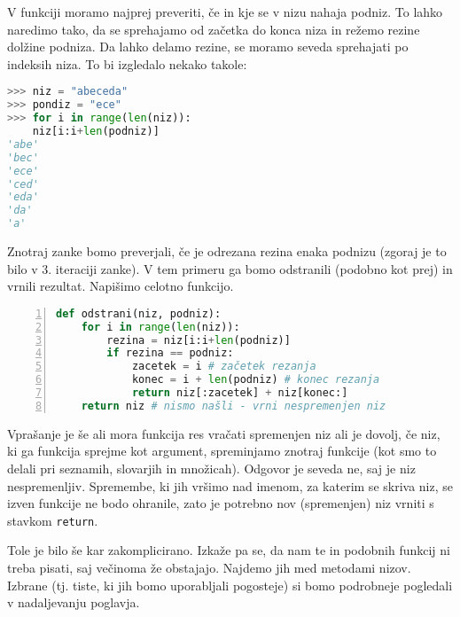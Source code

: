 \begin{resitev}
V funkciji moramo najprej preveriti, če in kje se v nizu nahaja podniz. To lahko naredimo tako, da se sprehajamo od začetka do konca niza in režemo rezine dolžine podniza. Da lahko delamo rezine, se moramo seveda sprehajati po indeksih niza. To bi izgledalo nekako takole:
\begin{lstlisting}[language=Python, showstringspaces=false]
>>> niz = "abeceda"
>>> pondiz = "ece"
>>> for i in range(len(niz)):
	niz[i:i+len(podniz)]
'abe'
'bec'
'ece'
'ced'
'eda'
'da'
'a'
\end{lstlisting}
Znotraj zanke bomo preverjali, če je odrezana rezina enaka podnizu (zgoraj je to bilo v 3. iteraciji zanke). V tem primeru ga bomo odstranili (podobno kot prej) in vrnili rezultat. Napišimo celotno funkcijo.
\begin{lstlisting}[language=Python, showstringspaces=false,numbers=left]
def odstrani(niz, podniz):
    for i in range(len(niz)):
        rezina = niz[i:i+len(podniz)]
        if rezina == podniz:
            zacetek = i # začetek rezanja
            konec = i + len(podniz) # konec rezanja
            return niz[:zacetek] + niz[konec:]
    return niz # nismo našli - vrni nespremenjen niz
\end{lstlisting}
Vprašanje je še ali mora funkcija res vračati spremenjen niz ali je dovolj, če niz, ki ga funkcija sprejme kot argument, spreminjamo znotraj funkcije (kot smo to delali pri seznamih, slovarjih in množicah). Odgovor je seveda ne, saj je niz nespremenljiv. Spremembe, ki jih vršimo nad imenom, za katerim se skriva niz, se izven funkcije ne bodo ohranile, zato je potrebno nov (spremenjen) niz vrniti s stavkom \texttt{return}. 
\end{resitev}

Tole je bilo še kar zakomplicirano. Izkaže pa se, da nam te in podobnih funkcij ni treba pisati, saj večinoma že obstajajo. Najdemo jih med metodami nizov. Izbrane (tj. tiste, ki jih bomo uporabljali pogosteje) si bomo podrobneje pogledali v nadaljevanju poglavja.

